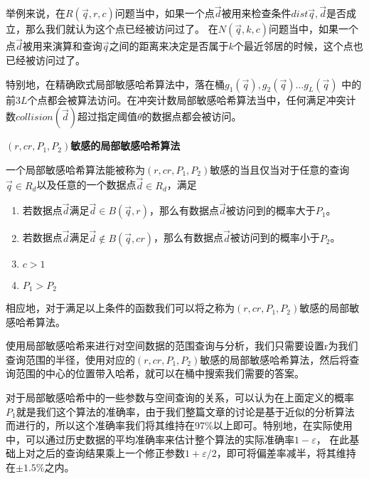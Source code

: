 举例来说，在$ R(\vec{q},r,c) $问题当中，如果一个点$ \vec{d} $被用来检查条件$ dist{\vec{q}, \vec{d}} $是否成立，那么我们就认为这个点已经被访问过了。 在$ N(\vec{q},k,c) $问题当中，如果一个点$ \vec{d} $被用来演算和查询$ \vec{q} $之间的距离来决定是否属于$ k $个最近邻居的时候，这个点也已经被访问过了。

特别地，在精确欧式局部敏感哈希算法中，落在桶$ g_1(\vec{q}),g_2(\vec{q}) \dots g_L(\vec{q}) $ 中的前$ 3L $个点都会被算法访问。在冲突计数局部敏感哈希算法当中，任何满足冲突计数$ collision(\vec{d}) $超过指定阈值$ \theta $的数据点都会被访问。

\begin{definition}
	{\bf $ (r,cr,P_1,P_2) $敏感的局部敏感哈希算法}
	
	一个局部敏感哈希算法能被称为$ (r,cr,P_1,P_2) $敏感的当且仅当对于任意的查询$ \vec{q} \in R_d $以及任意的一个数据点$ \vec{d} \in R_d$，满足
	
	\begin{enumerate}[(1)]
		
		\item 若数据点$ \vec{d} $满足$ \vec{d} \in B(\vec{q},r) $，那么有数据点$ \vec{d}  $被访问到的概率大于$ P_1 $。
		
		\item 若数据点$ \vec{d} $满足$ \vec{d} \notin B(\vec{q},cr) $，那么有数据点$ \vec{d}  $被访问到的概率小于$ P_2 $。 
		
		\item $ c > 1 $
		
		\item $ P_1 > P_2 $
				
	\end{enumerate}

	相应地，对于满足以上条件的函数我们可以将之称为$ (r,cr,P_1,P_2) $敏感的局部敏感哈希算法。
\end{definition}

使用局部敏感哈希来进行对空间数据的范围查询与分析，我们只需要设置r为我们查询范围的半径，使用对应的$ (r,cr,P_1,P_2) $敏感的局部敏感哈希算法，然后将查询范围的中心的位置带入哈希，就可以在桶中搜索我们需要的答案。

对于局部敏感哈希中的一些参数与空间查询的关系，可以认为在上面定义的概率$ P_1 $就是我们这个算法的准确率，由于我们整篇文章的讨论是基于近似的分析算法而进行的，所以这个准确率我们将其维持在97\%以上即可。特别地，在实际使用中，可以通过历史数据的平均准确率来估计整个算法的实际准确率$ 1 - \varepsilon $， 在此基础上对之后的查询结果乘上一个修正参数$ 1 + \varepsilon / 2 $，即可将偏差率减半，将其维持在$ \pm 1.5\% $之内。

